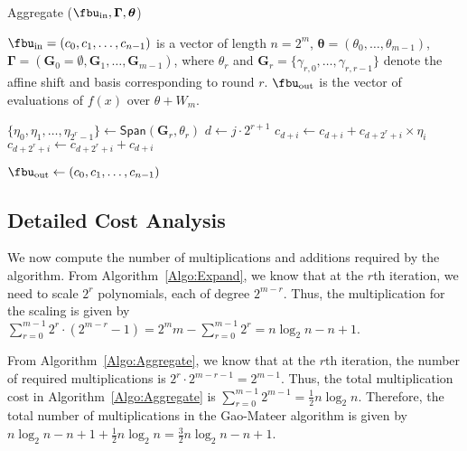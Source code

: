 


\begin{algorithm}
	\caption{\textsf{Aggregate} ($\fbu_\text{in}, \boldsymbol{\Gamma}, \boldsymbol{\theta}$)}
	\label{Algo:Aggregate}
	\begin{algorithmic}[1]
		\Require $\fbu_\text{in} = (c_0,c_1,\ldots,c_{n-1})$ is a vector of length $ n = 2^m$, 
		$\boldsymbol{\theta} = (\theta_0, \ldots, \theta_{m-1})$, 
		$\boldsymbol{\Gamma} = (\mathbf{G}_0 = \emptyset, \mathbf{G}_1, \ldots, \mathbf{G}_{m-1})$, 
		where $\theta_r$ and $\mathbf{G}_r = \{\gamma_{r,0},\ldots, \gamma_{r,r-1}\}$ denote the affine shift and basis corresponding to round $r$.
		\Ensure $\fbu_\text{out}$ is the vector of evaluations of $f(x)$ over $\theta + W_m$.
		
		\State $\{\eta_0, \eta_1, \ldots, \eta_{2^{r}-1} \} \gets \mathsf{Span}(\mathbf{G}_r, \theta_r)$
		\State $d \gets j \cdot 2^{r+1}$
		\State $c_{d+i} \gets c_{d+i} + c_{d+2^r+i} \times \eta_i$ \label{Step:AlgAgreeM1}
		\State $c_{d+2^r+i} \gets c_{d+2^r+i} + c_{d+i}$ \label{Step:AlgAgreeM2}
		\EndFor
		\EndFor
		\EndFor
		
		\State \Return $\fbu_\text{out} \gets (c_0,c_1,\ldots,c_{n-1})$
	\end{algorithmic}
\end{algorithm}



\subsection{Detailed Cost Analysis}\label{Sec:Cost-GM}
We now compute the number of multiplications and additions required by the algorithm. From Algorithm~\ref{Algo:Expand}, we know that at the $r$th iteration, we need to scale $2^r$ polynomials, each of degree $2^{m-r}$. Thus, the multiplication for the scaling is given by
$\sum_{r=0}^{m-1} 2^r \cdot (2^{m-r}-1)= 2^m m - \sum_{r=0}^{m-1} 2^r= n \log_2 n -n +1$.

From Algorithm~\ref{Algo:Aggregate}, we know that at the $r$th iteration, the number of required multiplications is $2^r \cdot 2^{m-r-1}=2^{m-1}$. Thus, the total multiplication cost in Algorithm~\ref{Algo:Aggregate} is $\sum_{r=0}^{m-1} 2^{m-1}=\frac{1}{2} n \log_2 n.$ Therefore, the total number of multiplications in the Gao-Mateer algorithm is given by $n \log_2 n -n +1 + \frac{1}{2} n \log_2 n = \frac{3}{2} n \log_2 n -n +1$.

